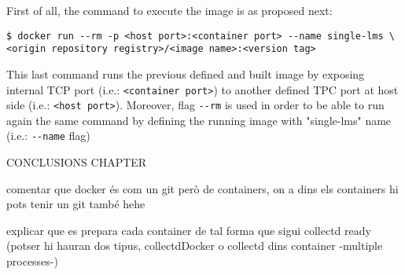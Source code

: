 First of all, the command to execute the image is as proposed next:

\begin{verbatim}
$ docker run --rm -p <host port>:<container port> --name single-lms \
<origin repository registry>/<image name>:<version tag>
\end{verbatim}

This last command runs the previous defined and built image by exposing internal TCP port (i.e.: \verb|<container port>|) to another defined TPC port at host side (i.e.: \verb|<host port>|). Moreover, flag \verb|--rm| is used in order to be able to run again the same command by defining the running image with "single-lms" name (i.e.: \verb|--name| flag)



CONCLUSIONS CHAPTER

comentar que docker és com un git però de containers, on a dins els containers hi pots tenir un git també hehe

explicar que es prepara cada container de tal forma que sigui collectd ready (potser hi hauran dos tipus, collectdDocker o collectd dins container -multiple processes-)

